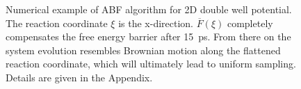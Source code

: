 \begin{figure}[H]
    \centering
    \caption{Numerical example of ABF algorithm for 2D double well potential. The reaction coordinate $\xi$ is the x-direction. $\overline{F}(\xi)$ completely compensates the free energy barrier after 15~ps. From there on the system evolution resembles Brownian motion along the flattened reaction coordinate, which will ultimately lead to uniform sampling. Details are given in the Appendix.}
\label{fig:ABF}%
\end{figure}

